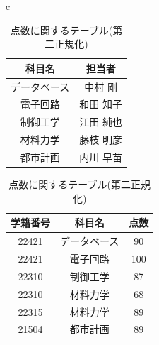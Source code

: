 \documentclass[a4j]{jarticle}
\begin{document}
        \begin{table}[H]
          \begin{center}
            \begin{tabular}{c}

              \begin{minipage}{0.5\hsize}
          \caption{科目に関するテーブル(第二正規化)}
            \label{subject2}
            \begin{center}
              \begin{tabular}{c|c}\hline
                科目名& 担当者 \\ \hline \hline
                データベース & 中村 剛 \\ \hline 
                電子回路 & 和田 知子 \\ \hline
                制御工学 & 江田 純也 \\ \hline
                材料力学 & 藤枝 明彦 \\ \hline
                都市計画 & 内川 早苗 \\ \hline
             \end{tabular}
          \end{center}
        \end{minipage}

        \begin{minipage}{0.5\hsize}
          \caption{点数に関するテーブル(第二正規化)}
          \label{score2}
          \begin{center}
            \begin{tabular}{c|c|c}\hline
              学籍番号 & 科目名 & 点数 \\ \hline \hline
              22421 & データベース & 90 \\ \hline
              22421 & 電子回路 & 100 \\ \hline
              22310 & 制御工学 & 87 \\ \hline
              22310 & 材料力学 & 68 \\ \hline
              22315 & 材料力学 & 89 \\ \hline
              21504 & 都市計画 & 89 \\ \hline
               \end{tabular}
            \end{center}
          \end{minipage}
        \end{tabular}
      \end{center}
            \end{table}
\end{document}
